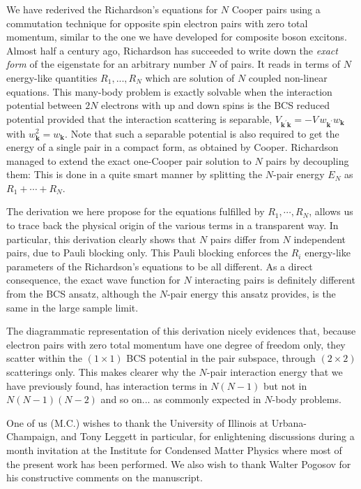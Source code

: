 \documentclass[aps,prb,superscriptaddress,showpacs,reprint,lengthcheck]{revtex4-1}
\begin{document}
We have rederived the Richardson's equations for $N$ Cooper pairs using a commutation technique for
opposite spin electron pairs with zero total momentum, similar to the one we have
developed for composite boson excitons. Almost half a century ago,
Richardson has succeeded to write down the \emph{exact form} of the eigenstate for an
arbitrary number $N$ of pairs. It reads in terms of $N$ energy-like
quantities $R_1,..., R_N$ which are solution of $N$ coupled non-linear
equations. This many-body problem is exactly solvable when the
interaction potential between $2N$ electrons with up and down spins is the BCS reduced potential provided that 
the interaction scattering is separable, $V_{\mathbf{k} ^{\prime}\mathbf{k} }=-V\,w_{\mathbf{k}
^{\prime}}w_{\mathbf{k} }$ with $w_{\mathbf{k}}^2=w_{\mathbf{k}}$.
Note that such a separable potential is also required to get
the energy of a single pair in a compact form, as obtained by Cooper.
Richardson managed to extend the exact one-Cooper pair solution to $N$ pairs by
decoupling them: This is done in a quite smart manner by splitting the $N$-pair energy $E_N$ as $R_1+\cdots+R_N$. 

The  derivation we here propose for the equations fulfilled by $R_1,\cdots,R_N$, allows us to trace back
the physical origin of the various terms in a transparent way. In
particular, this derivation clearly shows that $N$ pairs differ from $N$ independent
pairs, due to Pauli blocking only. This Pauli blocking
enforces the $R_i$ energy-like parameters of the Richardson's equations to be all different. 
As a direct consequence, the exact wave function for $N$ interacting pairs is 
definitely different from the BCS ansatz, although the $N$-pair energy this ansatz provides, is the same in the large sample limit. 

The diagrammatic
representation of this derivation nicely evidences that, because electron pairs
with zero total momentum have one degree of freedom only, they scatter within the $(1\times1)$ BCS potential in the pair subspace, through 
$(2\times2)$ scatterings only. This makes clearer
why the $N$-pair interaction energy that we have previously found, has interaction terms in $N(N-1)$ but not in $N(N-1)(N-2)
$ and so on... as commonly expected in $N$-body problems.

One of us (M.C.) wishes to thank the University of Illinois at
Urbana-Champaign, and Tony Leggett in particular, for enlightening discussions during a month invitation at
the Institute for Condensed Matter Physics where most of the present work has been
performed. We also wish to thank Walter Pogosov for his constructive comments on the manuscript.
\end{document}
